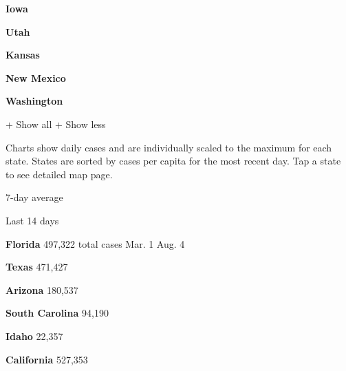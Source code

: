 \href{https://www.nytimes.com/interactive/2020/us/iowa-coronavirus-cases.html}{}

\textbf{Iowa}

\href{https://www.nytimes.com/interactive/2020/us/utah-coronavirus-cases.html}{}

\textbf{Utah}

\href{https://www.nytimes.com/interactive/2020/us/kansas-coronavirus-cases.html}{}

\textbf{Kansas}

\href{https://www.nytimes.com/interactive/2020/us/new-mexico-coronavirus-cases.html}{}

\textbf{New Mexico}

\href{https://www.nytimes.com/interactive/2020/us/washington-coronavirus-cases.html}{}

\textbf{Washington}

+ Show all + Show less

Charts show daily cases and are individually scaled to the maximum for
each state. States are sorted by cases per capita for the most recent
day. Tap a state to see detailed map page.

\href{https://www.nytimes.com/interactive/2020/us/florida-coronavirus-cases.html}{}

7-day average

Last 14 days

\textbf{Florida} 497,322 total cases Mar. 1 Aug. 4

\href{https://www.nytimes.com/interactive/2020/us/texas-coronavirus-cases.html}{}

\textbf{Texas} 471,427

\href{https://www.nytimes.com/interactive/2020/us/arizona-coronavirus-cases.html}{}

\textbf{Arizona} 180,537

\href{https://www.nytimes.com/interactive/2020/us/south-carolina-coronavirus-cases.html}{}

\textbf{South Carolina} 94,190

\href{https://www.nytimes.com/interactive/2020/us/idaho-coronavirus-cases.html}{}

\textbf{Idaho} 22,357

\href{https://www.nytimes.com/interactive/2020/us/california-coronavirus-cases.html}{}

\textbf{California} 527,353

\href{https://www.nytimes.com/interactive/2020/us/iowa-coronavirus-cases.html}{}

